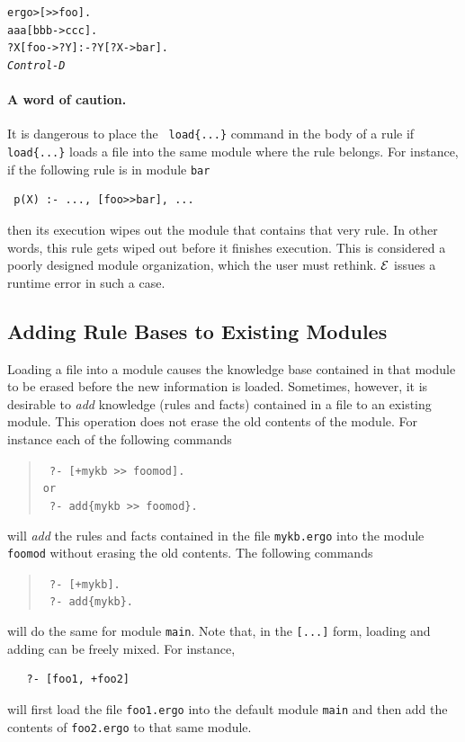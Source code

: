 \documentclass[11pt]{article}
\newcommand{\ERGO}{\mbox{\ensuremath{\cal{E}}\smaller{{\sc{RGO}}}}\xspace}
\newcommand{\FLSYSTEM}{\ERGO}
\newcommand{\prompt}{ergo> }
\newcommand{\ergoext}{ergo\xspace}
\begin{document}
\begin{alltt}
 \prompt [>{}>foo].
 aaa[bbb->ccc].
 ?X[foo->?Y] :- ?Y[?X->bar].
 \emph{Control-D}  
\end{alltt}


\paragraph{A word of caution.} It is dangerous to place the {\tt
  load\{...\}} command
in the body of a rule if {\tt load\{...\}} loads a file into the same module
where the rule belongs. For instance, if the following rule is in module
{\tt bar}  
\begin{verbatim}
 p(X) :- ..., [foo>>bar], ...  
\end{verbatim}
then its execution wipes out the module that contains that very
rule. In other words,
this rule gets wiped out before it finishes execution.
This is considered a poorly designed module organization, which the
user must rethink.
\FLSYSTEM issues a runtime error in such a case.


\subsection{Adding Rule Bases to Existing Modules}\label{sec-adding-to-mod}

Loading a file into a module causes the knowledge base contained in that
module to be erased before the new information is loaded. Sometimes,
however, it is desirable to \emph{add} knowledge (rules and facts)
contained in a file to an existing module.
This operation does not erase the old contents of the module.
For instance each of the following commands 

\index{[+file]}
\begin{quote}
  \tt
   ?- [+mykb >{}> foomod].\\
   or
   \\
    \tt
   ?- add\{mykb >{}> foomod\}.
\end{quote}
will \emph{add} the rules and facts contained in the file {\tt mykb.\ergoext} into the
module {\tt foomod} without erasing the old contents. The following commands
\begin{quote}
  \tt
   ?- [+mykb].\\
    \tt
   ?- add\{mykb\}.
\end{quote}
will do the same for module {\tt main}. Note that, in the {\tt [...]} form,  
loading and adding can be freely mixed. For instance, 
\begin{verbatim}
   ?- [foo1, +foo2]  
\end{verbatim}
will first load the file {\tt foo1.\ergoext} into the default module {\tt main}
and then add the contents of {\tt foo2.\ergoext} to that same module.
\end{document}
